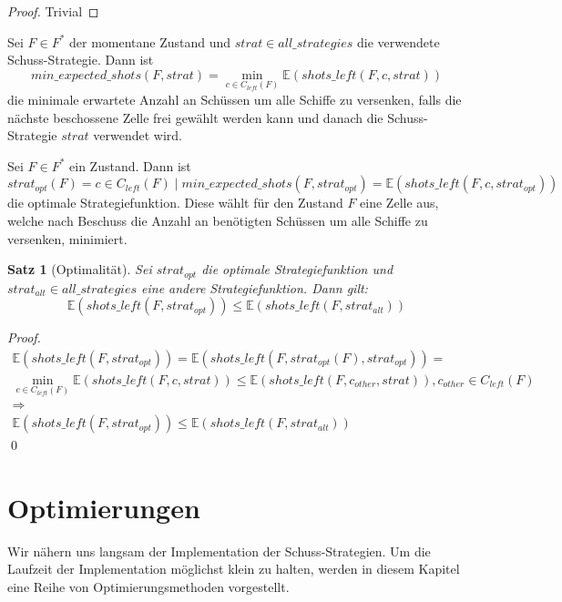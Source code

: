 \documentclass[a4paper,12pt]{llncs}
\numberwithin{equation}{section}
\newtheorem{satz}{Satz}
\begin{document}
\begin{proof}
Trivial
\end{proof}

\begin{definition}
Sei $F\in F^*$ der momentane Zustand und $strat \in all\_strategies$ die verwendete Schuss-Strategie.
Dann ist
\[
min\_expected\_shots(F, strat)=\min_{c \in C_{left}(F)} \mathds{E}(shots\_left(F, c, strat))
\]
die minimale erwartete Anzahl an Schüssen um alle Schiffe zu versenken, falls die nächste beschossene Zelle frei gewählt werden kann und danach die Schuss-Strategie $strat$ verwendet wird.
\end{definition}

\begin{definition}
Sei $F\in F^*$ ein Zustand.
Dann ist
\[
strat_{opt}(F)=c \in C_{left}(F) \mid min\_expected\_shots(F, strat_{opt})= \mathds{E}(shots\_left(F, c, strat_{opt}))
\]
die optimale Strategiefunktion.
Diese wählt für den Zustand $F$ eine Zelle aus, welche nach Beschuss die Anzahl an benötigten Schüssen um alle Schiffe zu versenken, minimiert.
\end{definition}

\begin{satz}[Optimalität]
Sei $strat_{opt}$ die optimale Strategiefunktion und $strat_{alt} \in all\_strategies$ eine andere Strategiefunktion.
Dann gilt:
\[
\mathds{E}(shots\_left(F, strat_{opt})) \leq \mathds{E}(shots\_left(F, strat_{alt}))
\]
\end{satz}

\begin{proof}
\begin{align}
\mathds{E}(shots\_left(F, strat_{opt})) =\mathds{E}(shots\_left(F, strat_{opt}(F), strat_{opt}))=\\
\min_{c \in C_{left}(F)} \mathds{E}(shots\_left(F, c, strat)) \leq \mathds{E}(shots\_left(F, c_{other}, strat)), c_{other} \in C_{left}(F)\\
\Rightarrow\\
\mathds{E}(shots\_left(F, strat_{opt})) \leq \mathds{E}(shots\_left(F, strat_{alt}))
\end{align}
\qed
\end{proof}

\newpage

\section{Optimierungen}

Wir nähern uns langsam der Implementation der Schuss-Strategien.
Um die Laufzeit der Implementation möglichst klein zu halten, werden in diesem Kapitel eine Reihe von Optimierungsmethoden vorgestellt.
\end{document}
